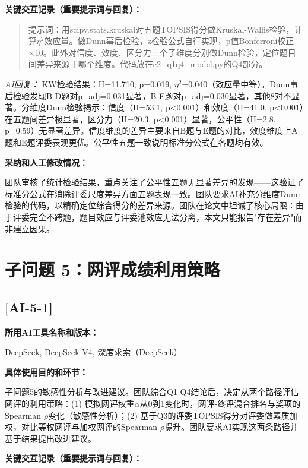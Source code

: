 \documentclass[12pt,a4paper]{ctexart}
\begin{document}
\textbf{关键交互记录（重要提示词与回复）：}\par

\begin{quote}
提示词：用scipy.stats.kruskal对五题TOPSIS得分做Kruskal-Wallis检验，计算$\eta^2$效应量。做Dunn事后检验，z检验公式自行实现，p值Bonferroni校正×10。此外对信度、效度、区分力三个子维度分别做Dunn检验，定位题目间差异来源于哪个维度。代码放在c2\_q1q4\_model.py的Q4部分。
\end{quote}

\textit{AI回复：} KW检验结果：H=11.710, p=0.019, $\eta^2$=0.040（效应量中等）。Dunn事后检验发现B-D题对p\_adj=0.031显著，B-E题对p\_adj=0.030显著，其他8对不显著。分维度Dunn检验揭示：信度（H=53.1, p<0.001）和效度（H=41.0, p<0.001）在五题间差异极显著，区分力（H=20.3, p<0.001）显著，公平性（H=2.8, p=0.59）无显著差异。信度维度的差异主要来自B题与E题的对比，效度维度上A题和E题评委表现更优。公平性五题一致说明标准分公式在各题均有效。

\textbf{采纳和人工修改情况：}\par
团队审核了统计检验结果，重点关注了公平性五题无显著差异的发现——这验证了标准分公式在消除评委尺度差异方面五题表现一致。团队要求AI补充分维度Dunn检验的代码，以精确定位综合得分的差异来源。团队在论文中坦诚了核心局限：由于评委完全不跨题，题目效应与评委池效应无法分离，本文只能报告"存在差异"而非建立因果。

\section*{子问题 5：网评成绩利用策略}

\subsection*{[AI-5-1]}

\textbf{所用AI工具名称和版本：}\par
DeepSeek, DeepSeek-V4, 深度求索（DeepSeek）

\textbf{具体使用目的和环节：}\par
子问题5的敏感性分析与改进建议。团队综合Q1-Q4结论后，决定从两个路径评估网评的利用策略：(1) 模拟网评权重$\alpha$从0到1变化时，网评-终评混合排名与奖项的Spearman $\rho$变化（敏感性分析）；(2) 基于Q3的评委TOPSIS得分对评委做素质加权，对比等权网评与加权网评的Spearman $\rho$提升。团队要求AI实现这两条路径并基于结果提出改进建议。

\textbf{关键交互记录（重要提示词与回复）：}\par
\end{document}
